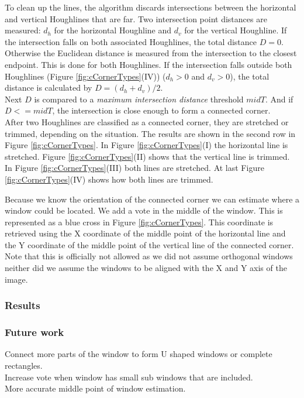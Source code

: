 To clean up the lines, the algorithm discards intersections between the
horizontal and vertical Houghlines that are far. 
Two intersection point distances are measured: $d_h$ for the horizontal Houghline and $d_v$
for the vertical Houghline.  If the intersection falls on both associated Houghlines,
	the total distance $D=0$.  Otherwise the Euclidean distance is measured from the
	intersection to the closest endpoint. This is done for both Houghlines.  If
	the intersection falls outside both Houghlines (Figure
	\ref{fig:cCornerTypes}(IV)) ($d_h>0$ and $d_v>0$), the total
	distance is calculated by $D=(d_h + d_v)/2$.\\
	Next $D$ is compared to
	a \emph{maximum intersection distance} threshold $midT$.  And if $D<=midT$,
	the intersection is close enough to form a connected corner.\\

After two Houghlines are classified as a connected corner, they are stretched or
trimmed, depending on the situation. The results are shown in the second row in
Figure \ref{fig:cCornerTypes}.
In Figure \ref{fig:cCornerTypes}(I)  the horizontal line is stretched.  Figure
\ref{fig:cCornerTypes}(II) shows that the vertical line is trimmed.  In Figure
\ref{fig:cCornerTypes}(III) both lines are stretched.  At last Figure
\ref{fig:cCornerTypes}(IV) shows how both lines are trimmed.


Because we know the orientation of the connected corner we can estimate where
a window could be located.  We add a vote in the middle of the window. 
This is represented as a blue cross in Figure \ref{fig:cCornerTypes}.
This coordinate is retrieved using the X coordinate of the middle point of the horizontal line
and the Y coordinate of the middle point of the vertical line of the connected corner.  
Note that this is officially not allowed as we did not assume orthogonal windows
neither did we assume the windows to be aligned with the X and Y axis of the
image.  

\subsubsection{Results}

\subsubsection{Future work}
Connect more parts of the window to form U shaped windows or complete rectangles.\\
Increase vote when window has small sub windows that are included.\\
More accurate middle point of window estimation. 


